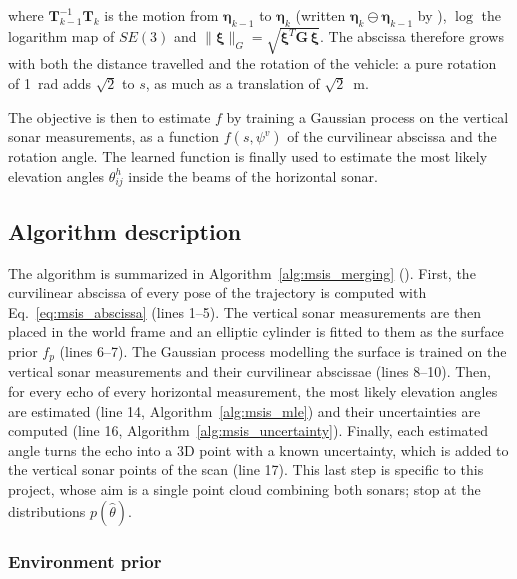 where $\mathbf{T}_{k-1}^{-1}\mathbf{T}_k$ is the motion from $\boldsymbol{\eta}_{k-1}$ to
$\boldsymbol{\eta}_k$ (written $\boldsymbol{\eta}_k \ominus \boldsymbol{\eta}_{k-1}$ by
\citealt{breux2020elevation}), $\log$ the logarithm map of $SE(3)$ and
$\lVert\boldsymbol{\xi}\rVert_G = \sqrt{\boldsymbol{\xi}^T\mathbf{G}\,\boldsymbol{\xi}}$. The abscissa
therefore grows with both the distance travelled and the rotation of the vehicle: a pure rotation
of 1~rad adds $\sqrt{2}$ to $s$, as much as a translation of $\sqrt{2}$~m.

The objective is then to estimate $f$ by training a Gaussian process on the vertical sonar
measurements, as a function $f(s, \psi^v)$ of the curvilinear abscissa and the rotation angle. The
learned function is finally used to estimate the most likely elevation angles $\theta^h_{ij}$ inside
the beams of the horizontal sonar.

\subsection{Algorithm description}       %
\label{sec:msis_algorithm}               %

The algorithm is summarized in Algorithm~\ref{alg:msis_merging} (). First, the curvilinear abscissa of
every pose of the trajectory is computed with Eq.~\eqref{eq:msis_abscissa} (lines 1--5). The
vertical sonar measurements are then placed in the world frame and an elliptic cylinder is fitted to
them as the surface prior $f_p$ (lines 6--7). The Gaussian process
modelling the surface is trained on the vertical sonar measurements and their curvilinear abscissae
(lines 8--10). Then, for every echo of every horizontal measurement, the most
likely elevation angles are estimated (line 14, Algorithm~\ref{alg:msis_mle}) and their uncertainties are computed (line 16,
Algorithm~\ref{alg:msis_uncertainty}). Finally, each estimated angle
turns the echo into a 3D point with a known uncertainty, which is added to the vertical sonar points
of the scan (line 17). This last step is specific to this project, whose aim is a single point cloud
combining both sonars; \citet{breux2020elevation} stop at the distributions $p(\hat{\theta})$.

\subsubsection{Environment prior}        %
\label{sec:msis_prior}                   %

